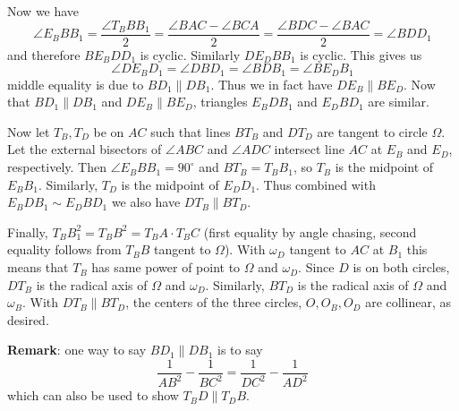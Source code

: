 \documentclass[11pt,a4paper]{article}
\begin{document}
\begin{enumerate}
		Now we have 
		\[
		\angle E_BBB_1
		= \frac{\angle T_BBB_1}{2}
		= \frac{\angle BAC - \angle BCA}{2}
		= \frac{\angle BDC - \angle BAC}{2}
		=\angle BDD_1
		\]
		and therefore $BE_BDD_1$ is cyclic. Similarly $DE_DBB_1$ is cyclic. This gives us 
		\[
		\angle DE_BD_1=\angle DBD_1
		=\angle BDB_1 = \angle BE_DB_1
		\]
		middle equality is due to $BD_1 \parallel DB_1$. Thus we in fact have $DE_B\parallel BE_D$. 
		Now that $BD_1 \parallel DB_1$ and $DE_B\parallel BE_D$, triangles $E_BDB_1$ 
		and $E_DBD_1$ are similar. 
		
		Now let $T_B, T_D$ be on $AC$ such that lines $BT_B$ and $DT_D$ are tangent to circle $\Omega$.  
		Let the external bisectors of $\angle ABC$ and $\angle ADC$ intersect line $AC$ at $E_B$ and $E_D$, respectively. 
		Then $\angle E_BBB_1=90^{\circ}$ and $BT_B = T_BB_1$, so $T_B$ is the midpoint of $E_BB_1$. 
		Similarly, $T_D$ is the midpoint of $E_DD_1$. 
		Thus combined with $E_BDB_1\sim E_DBD_1$ we also have 
		$DT_B\parallel BT_D$. 
		
		Finally, $T_BB_1^2 = T_BB^2 = T_BA\cdot T_BC$ 
		(first equality by angle chasing, second equality follows from $T_BB$ tangent to $\Omega$). 
		With $\omega_D$ tangent to $AC$ at $B_1$ this means that $T_B$ has same power of point to $\Omega$ and $\omega_D$. 
		Since $D$ is on both circles, 
		$DT_B$ is the radical axis of $\Omega$ and $\omega_D$. 
		Similarly, $BT_D$ is the radical axis of $\Omega$ and $\omega_B$. 
		With $DT_B\parallel BT_D$, the centers of the three circles, $O, O_B, O_D$ are collinear, as desired. 
		
		\textbf{Remark}: one way to say $BD_1\parallel DB_1$ is to say \[\frac{1}{AB^2}-\frac{1}{BC^2}=\frac{1}{DC^2}-\frac{1}{AD^2}\]
		which can also be used to show $T_BD\parallel T_DB$. 
	\end{enumerate}
	
\end{document}

